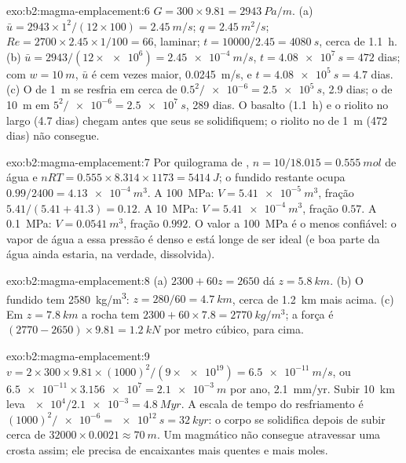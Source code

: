 \begin{solution}{exo:b2:magma-emplacement:6}
$G = 300\times9.81 = \qty{2943}{Pa/m}$. (a) $\bar u = 2943\times1^2/(12\times100) =
\qty{2.45}{m/s}$; $q = \qty{2.45}{m^2/s}$; $Re = 2700\times2.45\times1/100 = 66$, laminar;
$t = 10000/2.45 = \qty{4080}{s}$, cerca de \qty{1.1}{h}. (b) $\bar u =
2943/(12\times\num{e6}) = \qty{2.45e-4}{m/s}$, $t = \qty{4.08e7}{s} = 472$ dias; com
$w = \qty{10}{m}$, $\bar u$ é cem vezes maior, \qty{0.0245}{m/s}, e $t =
\qty{4.08e5}{s} = 4.7$ dias. (c) O  de \qty{1}{m} se resfria em cerca de
$0.5^2/\num{e-6} = \qty{2.5e5}{s}$, 2.9 dias; o  de \qty{10}{m} em $5^2/\num{e-6} =
\qty{2.5e7}{s}$, 289 dias. O basalto (\qty{1.1}{h}) e o riolito no 
largo (4.7 dias) chegam antes que seus  se solidifiquem; o riolito no
 de \qty{1}{m} (472 dias) não consegue.
\end{solution}

\begin{solution}{exo:b2:magma-emplacement:7}
Por quilograma de , $n = 10/18.015 = \qty{0.555}{mol}$ de água e $nRT =
0.555\times8.314\times1173 = \qty{5414}{J}$; o fundido restante ocupa $0.99/2400 =
\qty{4.13e-4}{m^3}$. A \qty{100}{MPa}: $V = \qty{5.41e-5}{m^3}$, fração
$5.41/(5.41 + 41.3) = 0.12$. A \qty{10}{MPa}: $V = \qty{5.41e-4}{m^3}$, fração
$0.57$. A \qty{0.1}{MPa}: $V = \qty{0.0541}{m^3}$, fração $0.992$. O valor a
\qty{100}{MPa} é o menos confiável: o vapor de água a essa pressão é denso e
está longe de ser ideal (e boa parte da água ainda estaria, na verdade, dissolvida).
\end{solution}

\begin{solution}{exo:b2:magma-emplacement:8}
(a) $2300 + 60z = 2650$ dá $z = \qty{5.8}{km}$. (b) O fundido tem
\qty{2580}{kg/m^3}: $z = 280/60 = \qty{4.7}{km}$, cerca de \qty{1.2}{km} mais acima. (c)
Em $z = \qty{7.8}{km}$ a rocha tem $2300 + 60\times7.8 = \qty{2770}{kg/m^3}$; a
força é $(2770 - 2650)\times9.81 = \qty{1.2}{kN}$ por metro cúbico, para cima.
\end{solution}

\begin{solution}{exo:b2:magma-emplacement:9}
$v = 2\times300\times9.81\times(1000)^2/(9\times\num{e19}) = \qty{6.5e-11}{m/s}$, ou
$\num{6.5e-11}\times\num{3.156e7} = \qty{2.1e-3}{m}$ por ano, \qty{2.1}{mm/yr}. Subir
\qty{10}{km} leva $\num{e4}/\num{2.1e-3} = \qty{4.8}{Myr}$. A escala de tempo do resfriamento
é $(1000)^2/\num{e-6} = \qty{e12}{s} = \qty{32}{kyr}$: o corpo se solidifica depois de
subir cerca de $32000\times0.0021 \approx \qty{70}{m}$. Um  magmático não consegue atravessar
uma crosta assim; ele precisa de encaixantes mais quentes e mais moles.
\end{solution}

